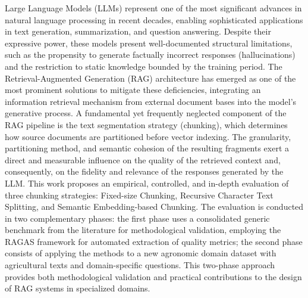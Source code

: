 \documentclass[
	12pt,				%
	openright,			%
	oneside,			%
	a4paper,			%
	tccpreliminar,		%
	]{ABNT-DC-UEL}
\begin{document}
\begin{Abstract}
Large Language Models (LLMs) represent one of the most significant advances in natural language processing in recent decades, enabling sophisticated applications in text generation, summarization, and question answering. Despite their expressive power, these models present well-documented structural limitations, such as the propensity to generate factually incorrect responses (hallucinations) and the restriction to static knowledge bounded by the training period. The Retrieval-Augmented Generation (RAG) architecture has emerged as one of the most prominent solutions to mitigate these deficiencies, integrating an information retrieval mechanism from external document bases into the model's generative process. A fundamental yet frequently neglected component of the RAG pipeline is the text segmentation strategy (chunking), which determines how source documents are partitioned before vector indexing. The granularity, partitioning method, and semantic cohesion of the resulting fragments exert a direct and measurable influence on the quality of the retrieved context and, consequently, on the fidelity and relevance of the responses generated by the LLM. This work proposes an empirical, controlled, and in-depth evaluation of three chunking strategies: Fixed-size Chunking, Recursive Character Text Splitting, and Semantic Embedding-based Chunking. The evaluation is conducted in two complementary phases: the first phase uses a consolidated generic benchmark from the literature for methodological validation, employing the RAGAS framework for automated extraction of quality metrics; the second phase consists of applying the methods to a new agronomic domain dataset with agricultural texts and domain-specific questions. This two-phase approach provides both methodological validation and practical contributions to the design of RAG systems in specialized domains.
\end{Abstract}

\listoffigures*
\cleardoublepage

\listoftables*
\cleardoublepage
\end{document}
